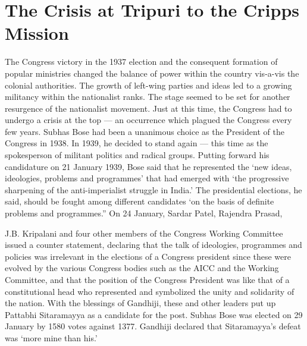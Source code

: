 \chapter{The Crisis at Tripuri to the Cripps Mission}



The Congress victory in the 1937 election and the consequent formation of popular ministries changed the balance of power within the country vis-a-vis the colonial authorities. The growth of left-wing parties and ideas led to a growing militancy within the nationalist ranks. The stage seemed to be set for another resurgence of the nationalist movement. Just at this time, the Congress had to undergo a crisis at the top — an occurrence which plagued the Congress every few years. Subhas Bose had been a unanimous choice as the President of the Congress in 1938. In 1939, he decided to stand again — this time as the spokesperson of militant politics and radical groups. Putting forward his candidature on 21 January 1939, Bose said that he represented the ‘new ideas, ideologies, problems and programmes’ that had emerged with ‘the progressive sharpening of the anti-imperialist struggle in India.’ The presidential elections, he said, should be fought among different candidates ‘on the basis of definite problems and programmes.” On 24 January, Sardar Patel, Rajendra Prasad, 

J.B. Kripalani and four other members of the Congress Working Committee issued a counter statement, declaring that the talk of ideologies, programmes and policies was irrelevant in the elections of a Congress president since these were evolved by the various Congress bodies such as the AICC and the Working Committee, and that the position of the Congress President was like that of a constitutional head who represented and symbolized the unity and solidarity of the nation. With the blessings of Gandhiji, these and other leaders put up Pattabhi Sitaramayya as a candidate for the post. Subhas Bose was elected on 29 January by 1580 votes against 1377. Gandhiji declared that Sitaramayya’s defeat was ‘more mine than his.’ 

